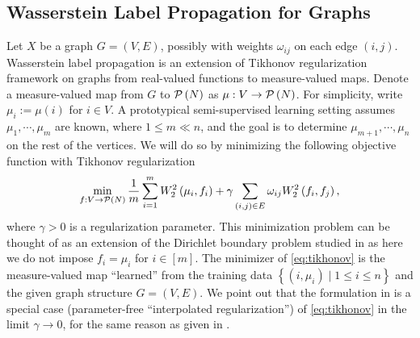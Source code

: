 \documentclass[letterpaper]{article} %
\begin{document}
\subsection{Wasserstein Label Propagation for Graphs}
Let $X$ be a graph $G= \left( V,E \right)$, possibly with weights $\omega_{ij}$ on each edge $\left(i,j\right)$. Wasserstein label propagation is an extension of Tikhonov regularization framework on graphs \cite{Belkin2004} from real-valued functions to measure-valued maps. 
Denote a measure-valued map from $G$ to $\P\left( N \right)$ as $\mu:V\rightarrow\P\left( N \right)$. For simplicity, write $\mu_i:=\mu \left( i \right)$ for $i\in V$. A prototypical semi-supervised learning setting assumes $\mu_1,\cdots,\mu_m$ are known, where $1\leq m \ll n$, and the goal is to determine $\mu_{m+1},\cdots,\mu_n$ on the rest of the vertices. We will do so by minimizing the following objective function with Tikhonov regularization
\begin{equation}
  \label{eq:tikhonov}
  \min_{f:V\rightarrow \P\left( N \right)}\frac{1}{m}\sum_{i=1}^m W^2_2 \left( \mu_i,f_i \right)+\gamma\sum_{\left( i,j \right)\in E}\omega_{ij}W^2_2 \left( f_i,f_j \right),
\end{equation}
where $\gamma>0$ is a regularization parameter. This minimization problem can be thought of as an extension of the Dirichlet boundary problem studied in \cite{Solomon:2014} as here we do not impose $f_i=\mu_i$ for $i\in [m]$.
The minimizer of \eqref{eq:tikhonov} is the measure-valued map ``learned'' from the training data $\left\{ \left( i,\mu_i \right)\mid 1\leq i\leq n \right\}$ and the given graph structure $G= \left( V,E \right)$. We point out that the formulation in \cite{Solomon:2014} is a special case (parameter-free ``interpolated regularization'') of \eqref{eq:tikhonov} in the limit $\gamma\rightarrow0$, for the same reason as given in \cite[]{Belkin2004}.
 
\end{document}

